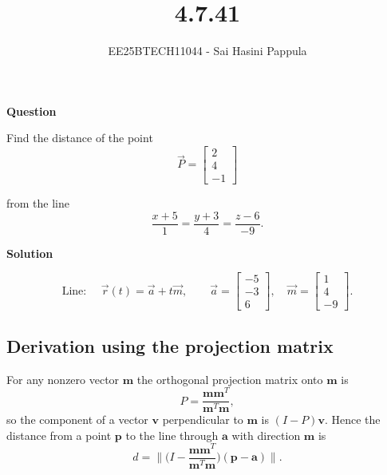 \documentclass[journal]{IEEEtran}
\begin{document}

\vspace{3cm}

\title{4.7.41}
\author{EE25BTECH11044 - Sai Hasini Pappula}
 \maketitle
{\let\newpage\relax\maketitle}

\renewcommand{\thefigure}{\theenumi}
\renewcommand{\thetable}{\theenumi}
\setlength{\intextsep}{10pt} 

\renewcommand{\thetable}{\theenumi}
\textbf{Question}

Find the distance of the point
\[
\vec{P}=\begin{bmatrix}2\\[2pt]4\\[2pt]-1\end{bmatrix}
\]

  from the line
\begin{equation}
\frac{x+5}{1}=\frac{y+3}{4}=\frac{z-6}{-9}.
\label{eq:given-line}
\end{equation}

\textbf{Solution}

\[
\text{Line: }\quad \vec r(t)=\vec a+t\vec m,\qquad
\vec a=\begin{bmatrix}-5\\[2pt]-3\\[2pt]6\end{bmatrix},\quad
\vec m=\begin{bmatrix}1\\[2pt]4\\[2pt]-9\end{bmatrix}.
\]

\subsection*{Derivation using the projection matrix}
For any nonzero vector \(\mathbf m\) the orthogonal projection matrix onto \(\mathbf m\) is
\begin{equation}
P=\frac{\mathbf m\mathbf m^{T}}{\mathbf m^{T}\mathbf m},
\end{equation}
so the component of a vector \(\mathbf v\) perpendicular to \(\mathbf m\) is \((I-P)\mathbf v\). Hence the distance from a point \(\mathbf p\) to the line through \(\mathbf a\) with direction \(\mathbf m\) is
\begin{equation}\label{eq:distance-matrix-derived}
d=\Big\lVert\Big(I-\frac{\mathbf m\mathbf m^{T}}{\mathbf m^{T}\mathbf m}\Big)(\mathbf p-\mathbf a)\Big\rVert.
\end{equation}
\end{document}
